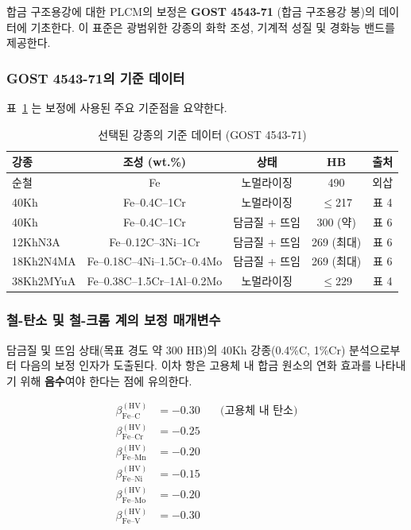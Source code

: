 \documentclass[12pt,a4paper]{article}
\begin{document}
	합금 구조용강에 대한 PLCM의 보정은 \textbf{GOST 4543-71} (합금 구조용강 봉)의 데이터에 기초한다. 이 표준은 광범위한 강종의 화학 조성, 기계적 성질 및 경화능 밴드를 제공한다.
	
	\subsubsection{GOST 4543-71의 기준 데이터}
	
	표~\ref{tab:steel_gost4543} 는 보정에 사용된 주요 기준점을 요약한다.
	
	\begin{table}[htbp]
		\centering
		\caption{선택된 강종의 기준 데이터 (GOST 4543-71)}
		\label{tab:steel_gost4543}
		\begin{tabular}{lcccc}
			\toprule
			\textbf{강종} & \textbf{조성 (wt.\%)} & \textbf{상태} & \textbf{HB} & \textbf{출처} \\
			\midrule
			순철 & Fe & 노멀라이징 & 490 & 외삽 \\
			40Kh & Fe–0.4C–1Cr & 노멀라이징 & $\le$217 & 표 4 \\
			40Kh & Fe–0.4C–1Cr & 담금질 + 뜨임 & 300 (약) & 표 6 \\
			12KhN3A & Fe–0.12C–3Ni–1Cr & 담금질 + 뜨임 & 269 (최대) & 표 6 \\
			18Kh2N4MA & Fe–0.18C–4Ni–1.5Cr–0.4Mo & 담금질 + 뜨임 & 269 (최대) & 표 6 \\
			38Kh2MYuA & Fe–0.38C–1.5Cr–1Al–0.2Mo & 노멀라이징 & $\le$229 & 표 4 \\
			\bottomrule
		\end{tabular}
	\end{table}
	
	\subsubsection{철-탄소 및 철-크롬 계의 보정 매개변수}
	
	담금질 및 뜨임 상태(목표 경도 약 300 HB)의 40Kh 강종(0.4\%C, 1\%Cr) 분석으로부터 다음의 보정 인자가 도출된다. 이차 항은 고용체 내 합금 원소의 연화 효과를 나타내기 위해 \textbf{음수}여야 한다는 점에 유의한다.
	
	\[
	\begin{aligned}
		\beta_{\text{Fe–C}}^{(\text{HV})} &= -0.30 \quad &\text{(고용체 내 탄소)} \\
		\beta_{\text{Fe–Cr}}^{(\text{HV})} &= -0.25 \\
		\beta_{\text{Fe–Mn}}^{(\text{HV})} &= -0.20 \\
		\beta_{\text{Fe–Ni}}^{(\text{HV})} &= -0.15 \\
		\beta_{\text{Fe–Mo}}^{(\text{HV})} &= -0.20 \\
		\beta_{\text{Fe–V}}^{(\text{HV})} &= -0.30
	\end{aligned}
	\]
	
\end{document}
